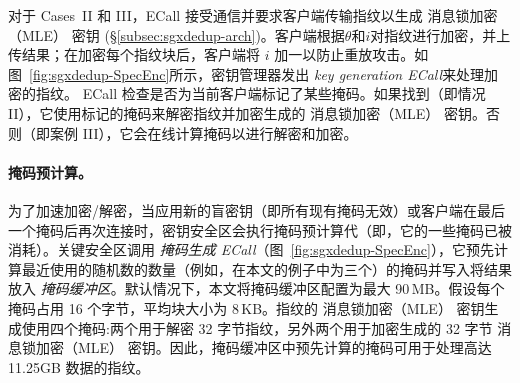 对于 Cases~II 和 III，ECall 接受通信并要求客户端传输指纹以生成 消息锁加密（MLE） 密钥 (\S\ref{subsec:sgxdedup-arch})。客户端根据$\theta$和$i$对指纹进行加密，并上​​传结果；在加密每个指纹块后，客户端将 $i$ 加一以防止重放攻击。如图~\ref{fig:sgxdedup-SpecEnc}所示，密钥管理器发出\textit{ key generation ECall}来处理加密的指纹。 ECall 检查是否为当前客户端标记了某些掩码。如果找到（即情况 II），它使用标记的掩码来解密指纹并加密生成的 消息锁加密（MLE） 密钥。否则（即案例 III），它会在线计算掩码以进行解密和加密。

\paragraph*{掩码预计算。} 为了加速加密/解密，当应用新的盲密钥（即所有现有掩码无效）或客户端在最后一个掩码后再次连接时，密钥安全区会执行掩码预计算代（即，它的一些掩码已被消耗）。关键安全区调用 \textit{ 掩码生成 ECall}（图~\ref{fig:sgxdedup-SpecEnc}），它预先计算最近使用的随机数的数量（例如，在本文的例子中为三个）的掩码并写入将结果放入 \textit{ 掩码缓冲区}。默认情况下，本文将掩码缓冲区配置为最大 90\,MB。假设每个掩码占用 16 个字节，平均块大小为 8\,KB。指纹的 消息锁加密（MLE） 密钥生成使用四个掩码:两个用于解密 32 字节指纹，另外两个用于加密生成的 32 字节 消息锁加密（MLE） 密钥。因此，掩码缓冲区中预先计算的掩码可用于处理高达 11.25GB 数据的指纹。
